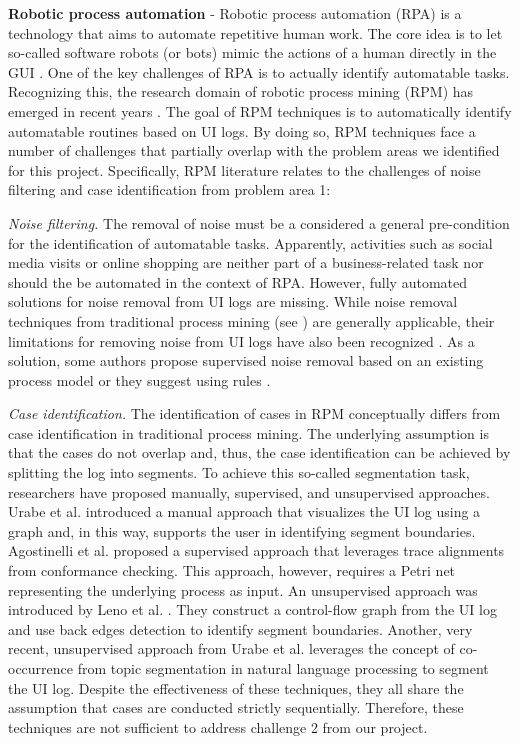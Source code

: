\textbf{Robotic process automation} - Robotic process automation (RPA) is a technology that aims to automate repetitive human work. The core idea is to let so-called software robots (or bots) mimic the actions of a human directly in the GUI \cite{SYED2020103162}. One of the key challenges of RPA is to actually identify automatable tasks.  Recognizing this, the research domain of robotic process mining (RPM) has emerged in recent years \cite{leno2021robotic}. The goal of RPM techniques is to automatically identify automatable routines based on UI logs. By doing so, RPM techniques face a number of challenges that partially overlap with the problem areas we identified for this project. Specifically, RPM literature relates to the challenges of noise filtering and case identification from problem area 1:   

\textit{Noise filtering.} The removal of noise  must be a considered a general pre-condition for the identification of automatable tasks. Apparently, activities such as social media visits or online shopping are neither part of a business-related task nor should the be automated in the context of RPA. However, fully automated solutions for noise removal from UI logs are missing. While noise removal techniques from traditional process mining (see \cite{tax2017discovering,CHENG2015138}) are generally applicable, their limitations for removing noise from UI logs have also been recognized \cite{leno2021robotic}. As a solution, some authors propose supervised noise removal based on an existing process model \cite{agostinelli202111} or they suggest using rules \cite{bosco2019discovering,leno2020identifying}. 

\textit{Case identification.} The identification of cases in RPM conceptually differs from case identification in traditional process mining. The underlying assumption is that the cases do not overlap and, thus, the case identification can be achieved by splitting the log into segments. To achieve this so-called segmentation task, researchers have proposed manually, supervised, and unsupervised approaches. Urabe et al. \cite{urabe2019visualizing} introduced a manual approach that visualizes the UI log using a graph and, in this way, supports the user in identifying segment boundaries. Agostinelli et al. \cite{agostinelli202111} proposed a supervised approach that leverages trace alignments from conformance checking. This approach, however, requires a Petri net representing the underlying process as input. An unsupervised approach was introduced by Leno et al. \cite{leno2020identifying}. They construct a control-flow graph from the UI log and use back edges detection to identify segment boundaries. Another, very recent, unsupervised approach from Urabe et al. \cite{Urabe21} leverages the concept of co-occurrence from topic segmentation in natural language processing to segment the UI log. Despite the effectiveness of these techniques, they all share the assumption that cases are conducted strictly sequentially. Therefore, these techniques are not sufficient to address challenge 2 from our project.   

